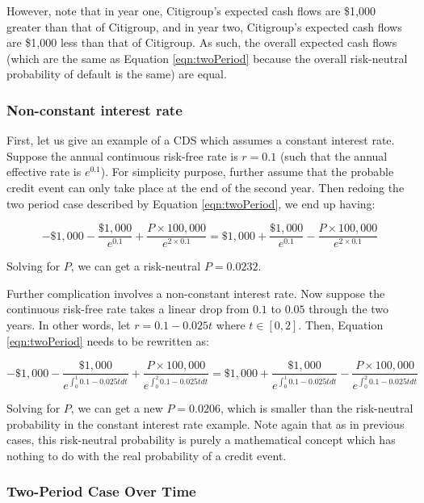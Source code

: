 \documentclass{jss}
\begin{document}
However, note that in year one, Citigroup's expected cash flows are \$1,000 greater than that of Citigroup, and in year two, Citigroup's expected cash flows are \$1,000 less than that of Citigroup. As such, the overall expected cash flows (which are the same as Equation \eqref{eqn:twoPeriod} because the overall risk-neutral probability of default is the same) are equal.


\subsubsection{Non-constant interest rate}
\label{sec:nonConstantInterestRate}

First, let us give an example of a CDS which assumes a constant interest rate. Suppose the annual continuous risk-free rate is $r = 0.1$ (such that the annual effective rate is $e^{0.1}$). For simplicity purpose, further assume that the probable credit event can only take place at the end of the second year. Then redoing the two period case described by Equation \eqref{eqn:twoPeriod}, we end up having:

$$-\$1,000 - \frac{\$ 1,000}{e^{0.1}} + \frac{P \times 100,000}{e^{2\times 0.1}} = \$1,000 + \frac{\$ 1,000}{e^{0.1}} - \frac{P \times 100,000}{e^{2\times 0.1}}$$

Solving for $P$, we can get a risk-neutral $P = 0.0232$.

Further complication involves a non-constant interest rate. Now suppose the continuous risk-free rate takes a linear drop from $0.1$ to $0.05$ through the two years. In other words, let $r = 0.1 - 0.025t$ where $t \in [0, 2]$. Then,  Equation \eqref{eqn:twoPeriod} needs to be rewritten as:

$$-\$1,000 - \frac{\$ 1,000}{e^{\int_0^1 0.1 - 0.025t dt}} + \frac{P \times 100,000}{e^{\int_0^2 0.1 - 0.025t dt}} = \$1,000 + \frac{\$ 1,000}{e^{\int_0^1 0.1 - 0.025t dt}} - \frac{P \times 100,000}{e^{\int_0^2 0.1 - 0.025t dt}}$$

Solving for $P$, we can get a new $P = 0.0206$, which is smaller than the risk-neutral probability in the constant interest rate example. Note again that as in previous cases, this risk-neutral probability is purely a mathematical concept which has nothing to do with the real probability of a credit event.

\subsubsection{Two-Period Case Over Time}
\end{document}
